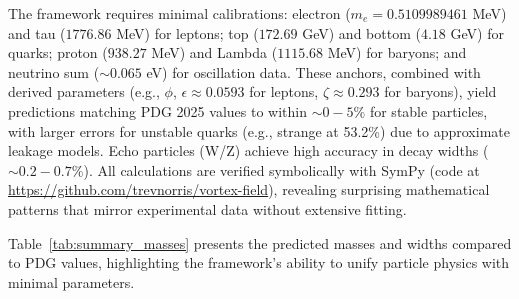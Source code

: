 The framework requires minimal calibrations: electron ($m_e = 0.5109989461$ MeV) and tau ($1776.86$ MeV) for leptons; top ($172.69$ GeV) and bottom ($4.18$ GeV) for quarks; proton ($938.27$ MeV) and Lambda ($1115.68$ MeV) for baryons; and neutrino sum ($\sim 0.065$ eV) for oscillation data. These anchors, combined with derived parameters (e.g., $\phi$, $\epsilon \approx 0.0593$ for leptons, $\zeta \approx 0.293$ for baryons), yield predictions matching PDG 2025 values to within $\sim 0-5\%$ for stable particles, with larger errors for unstable quarks (e.g., strange at 53.2\%) due to approximate leakage models. Echo particles (W/Z) achieve high accuracy in decay widths ($\sim 0.2-0.7\%$). All calculations are verified symbolically with SymPy (code at \url{https://github.com/trevnorris/vortex-field}), revealing surprising mathematical patterns that mirror experimental data without extensive fitting.

Table~\ref{tab:summary_masses} presents the predicted masses and widths compared to PDG values, highlighting the framework’s ability to unify particle physics with minimal parameters.

